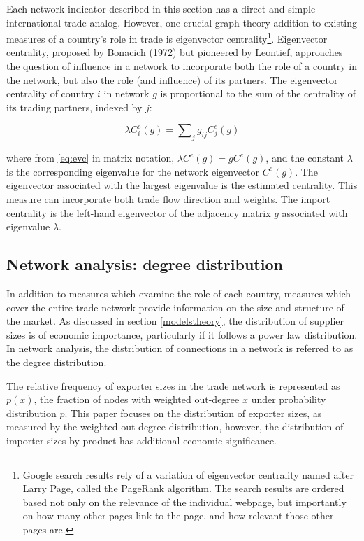 \documentclass[10pt,letterpaper,pdftex]{article}
\begin{document}
Each network indicator described in this section has a direct and simple international trade analog. However, one crucial graph theory addition to existing measures of a country's role in trade is eigenvector centrality\footnote{Google search results rely of a variation of eigenvector centrality named after Larry Page, called the PageRank algorithm. The search results are ordered based not only on the relevance of the individual webpage, but importantly on how many other pages link to the page, and how relevant those other pages are.}. Eigenvector centrality, proposed by Bonacich (1972) but pioneered by Leontief, approaches the question of influence in a network to incorporate both the role of a country in the network, but also the role (and influence) of its partners. The eigenvector centrality of country $i$ in network $g$ is proportional to the sum of the centrality of its trading partners, indexed by $j$:

\begin{equation}\label{eq:evc}
\lambda C^e_i(g) = \sum\nolimits_{j} g_{ij}C^e_j(g)
\end{equation}

where from \eqref{eq:evc} in matrix notation, $\lambda C^e(g) = gC^e(g)$, and the constant $\lambda$ is the corresponding eigenvalue for the network eigenvector $C^e(g)$. The eigenvector associated with the largest eigenvalue is the estimated centrality. This measure can incorporate both trade flow direction and weights. The import centrality is the left-hand eigenvector of the adjacency matrix $g$ associated with eigenvalue $\lambda$.

\subsection{Network analysis: degree distribution} \label{nw4}
In addition to measures which examine the role of each country, measures which cover the entire trade network provide information on the size and structure of the market. As discussed in section \ref{modelstheory}, the distribution of supplier sizes is of economic importance, particularly if it follows a power law distribution. In network analysis, the distribution of connections in a network is referred to as the degree distribution. 

The relative frequency of exporter sizes in the trade network is represented as $p(x)$, the fraction of nodes with weighted out-degree $x$ under probability distribution $p$. This paper focuses on the distribution of exporter sizes, as measured by the weighted out-degree distribution, however, the distribution of importer sizes by product has additional economic significance.
\end{document}
